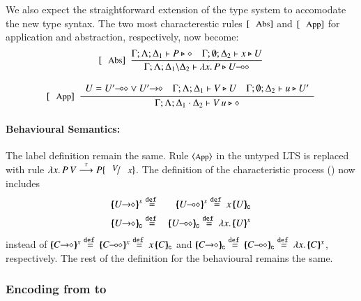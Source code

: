 We also expect the straightforward extension of the type 
system to accomodate the new type syntax. The two
most characterestic rules $\trule{Abs}$ and $\trule{App}$ 
for application and abstraction, respectively, now become:
\[
	\begin{array}{c}
		\trule{Abs}~~\tree{
			\Gamma; \Lambda; \Delta_1 \proves P \hastype \Proc
			\quad
			\Gamma; \es; \Delta_2 \proves x \hastype U
		}{
			\Gamma; \Lambda; \Delta_1 \backslash \Delta_2 \proves \abs{x}{P} \hastype \lhot{U}
		}
		\\[6mm]

		\trule{App}~~\tree{
			\begin{array}{c}
				U = \lhot{U'} \lor \shot{U'}
				\quad
				\Gamma; \Lambda; \Delta_1 \proves V \hastype U
				\quad
				\Gamma; \es; \Delta_2 \proves u \hastype U'
			\end{array}
		}{
			\Gamma; \Lambda; \Delta_1 \cat \Delta_2 \proves \appl{V}{u} \hastype \Proc
		} 
	\end{array}
\]


\paragraph{Behavioural Semantics:}
The label definition remain the same.
Rule ${\footnotesize \langle \textrm{App} \rangle}$ in the untyped LTS
is replaced with rule
$\appl{\abs{x}{P}}{V} \by{\tau} P \subst{V}{x}$.
The definition of the
characteristic process ()
now includes
\begin{eqnarray*}
\mapchar{\shot{U}}{x} & \defeq & \mapchar{\lhot{U}}{x} \defeq \appl{x}{\omapchar{U}} \\
\omapchar{\shot{U}} & \defeq & \omapchar{\lhot{U}} \defeq \abs{x}{\mapchar{U}{x}}
\end{eqnarray*}
instead of $\mapchar{\shot{C}}{x} \defeq \mapchar{\lhot{C}}{x} \defeq \appl{x}{\omapchar{C}}$
and
$\omapchar{\shot{C}} \defeq \omapchar{\lhot{C}} \defeq \abs{x}{\mapchar{C}{x}}$, respectively.
\noi The rest of the definition for the behavioural remains the same.

\subsubsection{Encoding from \HOpp to \HOp}

